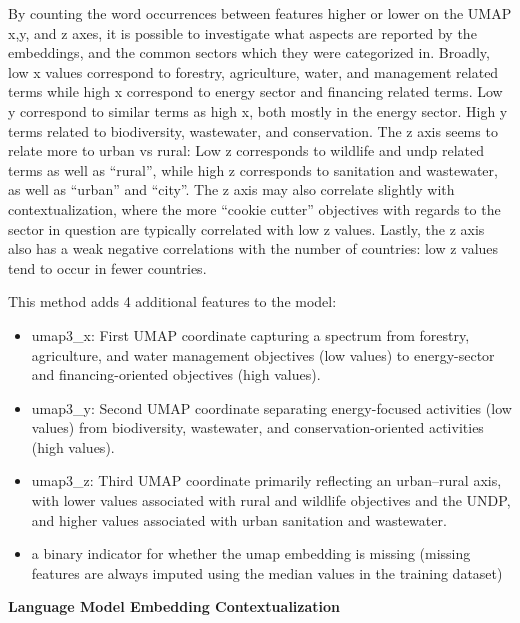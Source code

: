 By counting the word occurrences between features higher or lower on the UMAP x,y, and z axes, it is possible to investigate what aspects are reported by the embeddings, and the common sectors which they were categorized in. Broadly, low x values correspond to forestry, agriculture, water, and management related terms while high x correspond to energy sector and financing related terms. Low y correspond to similar terms as high x, both mostly in the energy sector. High y terms related to biodiversity, wastewater, and conservation. The z axis seems to relate more to urban vs rural: Low z corresponds to wildlife and undp related terms as well as ``rural'', while high z corresponds to sanitation and wastewater, as well as ``urban'' and ``city''. The z axis may also correlate slightly with contextualization, where the more ``cookie cutter'' objectives with regards to the sector in question are typically correlated with low z values. Lastly, the z axis also has a weak negative correlations with the number of countries: low z values tend to occur in fewer countries.

This method adds 4 additional features to the model:
\begin{itemize}
  \item umap3\_x: First UMAP coordinate capturing a spectrum from forestry, agriculture, and water management objectives (low values) to energy-sector and financing-oriented objectives (high values).
  \item umap3\_y: Second UMAP coordinate separating energy-focused activities (low values) from biodiversity, wastewater, and conservation-oriented activities (high values).
  \item umap3\_z: Third UMAP coordinate primarily reflecting an urban–rural axis, with lower values associated with rural and wildlife objectives and the UNDP, and higher values associated with urban sanitation and wastewater.
  \item a binary indicator for whether the umap embedding is missing (missing features are always imputed using the median values in the training dataset)
\end{itemize}

\textbf{Language Model Embedding Contextualization}

